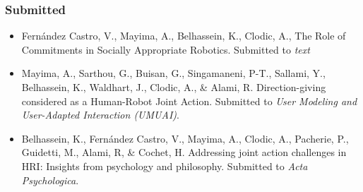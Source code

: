 \documentclass[a4paper,11pt,twoside]{StyleThese}
\begin{document}
\subsubsection*{Submitted}
\begin{itemize}
\item Fernández Castro, V., Mayima, A., Belhassein, K., Clodic, A., The Role of Commitments in Socially Appropriate Robotics. Submitted to \textit{text}

\item Mayima, A., Sarthou, G., Buisan, G., Singamaneni, P-T., Sallami, Y., Belhassein, K., Waldhart, J., Clodic, A., \& Alami, R. Direction-giving considered as a Human-Robot Joint
Action. Submitted to \textit{User Modeling and User-Adapted Interaction (UMUAI)}.

\item Belhassein, K., Fernández Castro, V., Mayima, A., Clodic, A., Pacherie, P., Guidetti, M., Alami, R, \& Cochet, H. Addressing joint action challenges in HRI: Insights from psychology
and philosophy. Submitted to \textit{Acta Psychologica}.
\end{itemize}	







 

\ifdefined{}
\else


\end{document}
